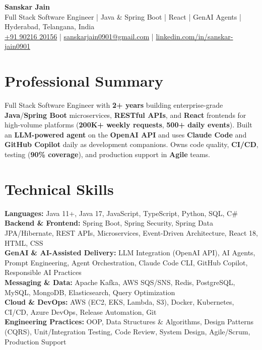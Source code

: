 \documentclass[a4paper,10pt]{article}
\begin{document}
\begin{center}
    {\LARGE \textbf{Sanskar Jain}} \\
    \vspace{2pt}
    Full Stack Software Engineer \;|\; Java \& Spring Boot \;|\; React \;|\; GenAI Agents \;|\; Hyderabad, Telangana, India \\
    \vspace{2pt}
    \href{tel:+919021620156}{+91 90216 20156} \;|\;
    \href{mailto:sanskarjain0901@gmail.com}{sanskarjain0901@gmail.com} \;|\;
    \href{https://www.linkedin.com/in/sanskar-jain0901/}{linkedin.com/in/sanskar-jain0901}
\end{center}

\section*{Professional Summary}
Full Stack Software Engineer with \textbf{2+ years} building enterprise-grade \textbf{Java}/\textbf{Spring Boot} microservices, \textbf{RESTful APIs}, and \textbf{React} frontends for high-volume platforms (\textbf{200K+ weekly requests}, \textbf{500+ daily events}).
Built an \textbf{LLM-powered agent} on the \textbf{OpenAI API} and uses \textbf{Claude Code} and \textbf{GitHub Copilot} daily as development companions.
Owns code quality, \textbf{CI/CD}, testing (\textbf{90\% coverage}), and production support in \textbf{Agile} teams.

\section*{Technical Skills}
\begin{sloppypar}
\noindent
\textbf{Languages:} Java 11+, Java 17, JavaScript, TypeScript, Python, SQL, C\# \\
\textbf{Backend \& Frontend:} Spring Boot, Spring Security, Spring Data JPA/Hibernate, REST APIs, Microservices, Event-Driven Architecture, React 18, HTML, CSS \\
\textbf{GenAI \& AI-Assisted Delivery:} LLM Integration (OpenAI API), AI Agents, Prompt Engineering, Agent Orchestration, Claude Code CLI, GitHub Copilot, Responsible AI Practices \\
\textbf{Messaging \& Data:} Apache Kafka, AWS SQS/SNS, Redis, PostgreSQL, MySQL, MongoDB, Elasticsearch, Query Optimization \\
\textbf{Cloud \& DevOps:} AWS (EC2, EKS, Lambda, S3), Docker, Kubernetes, CI/CD, Azure DevOps, Release Automation, Git \\
\textbf{Engineering Practices:} OOP, Data Structures \& Algorithms, Design Patterns (CQRS), Unit/Integration Testing, Code Review, System Design, Agile/Scrum, Production Support
\end{sloppypar}
\end{document}
